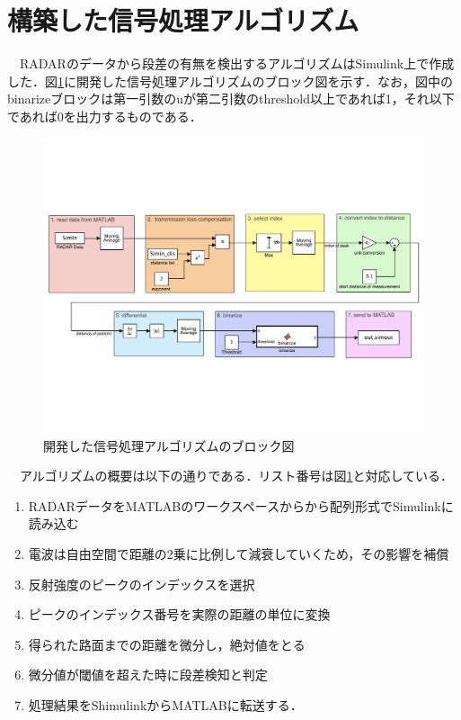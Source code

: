 \section{構築した信号処理アルゴリズム}
　RADARのデータから段差の有無を検出するアルゴリズムはSimulink上で作成した．図\ref{fig:System_Block_Color}に開発した信号処理アルゴリズムのブロック図を示す．なお，図中のbinarizeブロックは第一引数のuが第二引数のthreshold以上であれば1，それ以下であれば0を出力するものである．
\begin{figure}[H]
    \centering
    \includegraphics[width=13cm]{./fig/System_Block_Color.pdf}
    \caption{開発した信号処理アルゴリズムのブロック図}
    \label{fig:System_Block_Color}
\end{figure}

　アルゴリズムの概要は以下の通りである．リスト番号は図\ref{fig:System_Block_Color}と対応している．
\begin{enumerate}
    \item RADARデータをMATLABのワークスペースからから配列形式でSimulinkに読み込む
    \item 電波は自由空間で距離の2乗に比例して減衰していくため，その影響を補償
    \item 反射強度のピークのインデックスを選択
    \item ピークのインデックス番号を実際の距離の単位に変換
    \item 得られた路面までの距離を微分し，絶対値をとる
    \item 微分値が閾値を超えた時に段差検知と判定
    \item 処理結果をShimulinkからMATLABに転送する．
\end{enumerate}

